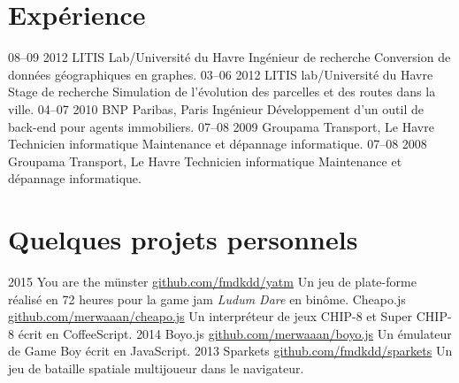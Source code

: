 \documentclass[]{friggeri-cv}
\begin{document}
\section{Expérience}

\begin{entrylist}
  \entry
    {08–09 2012}
    {LITIS Lab/Université du Havre}
    {Ingénieur de recherche}
    {Conversion de données géographiques en graphes.}
  \entry
    {03–06 2012}
    {LITIS lab/Université du Havre}
    {Stage de recherche}
    {Simulation de l'évolution des parcelles et des routes dans la ville.}
  \entry
    {04–07 2010}
    {BNP Paribas, Paris}
    {Ingénieur}
    {Développement d'un outil de back-end pour agents immobiliers.}
  \entry
    {07–08 2009}
    {Groupama Transport, Le Havre}
    {Technicien informatique}
    {Maintenance et dépannage informatique.}
  \entry
    {07–08 2008}
    {Groupama Transport, Le Havre}
    {Technicien informatique}
    {Maintenance et dépannage informatique.}
\end{entrylist}

\section{Quelques projets personnels}

\begin{entrylist}
  \entry
    {2015}
    {You are the münster}
    {\href{http://github.com/fmdkdd/yatm}{github.com/fmdkdd/yatm}}
    {Un jeu de plate-forme réalisé en 72 heures pour la game jam \textit{Ludum Dare} en binôme.}
  \entry
    {}
    {Cheapo.js}
    {\href{http://github.com/merwaaan/cheapo.js}{github.com/merwaaan/cheapo.js}}
    {Un interpréteur de jeux CHIP-8 et Super CHIP-8 écrit en CoffeeScript.}
  \entry
    {2014}
    {Boyo.js}
    {\href{http://github.com/merwaaan/boyo.js}{github.com/merwaaan/boyo.js}}
    {Un émulateur de Game Boy écrit en JavaScript.}
  \entry
    {2013}
    {Sparkets}
    {\href{http://github.com/fmdkdd/sparkets}{github.com/fmdkdd/sparkets}}
    {Un jeu de bataille spatiale multijoueur dans le navigateur.}
\end{entrylist}
\end{document}
